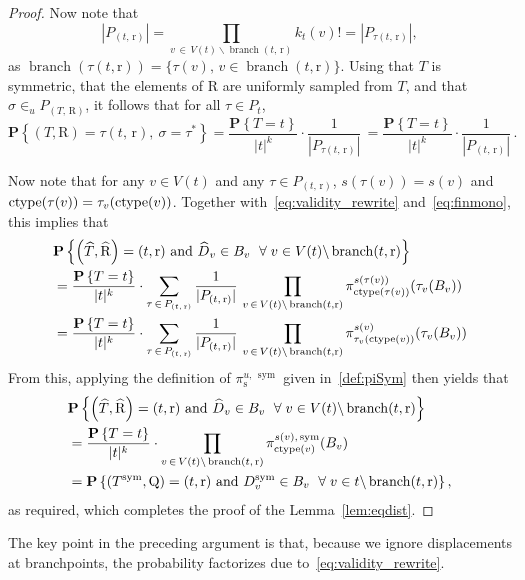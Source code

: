 \documentclass[10pt]{amsart}
\theoremstyle{definition}\newtheorem{defi}[theo]{Definition}\newtheorem{rema}[theo]{Remark}\newtheorem{exam}[theo]{Example}\newtheorem{exem}[theo]{Example}\newtheorem{nota}[theo]{Notation}
\newcommand{\rQ}{\mathrm{Q}}
\newcommand{\rR}{\mathrm{R}}
\newcommand{\rr}{\mathrm{r}}
\newcommand{\rs}{\mathrm{s}}
\DeclareMathOperator{\sym}{sym}
\DeclareMathOperator{\branch}{branch }
\DeclareMathOperator{\cht}{ctype}
\newcommand{\p}[1]{\mathbf{P}\left\{#1\right\}}
\newcommand{\Permvecs}{P}
\let\oldhat\hat
\renewcommand*{\hat}[1]{\mathchoice{\widehat{#1}}{\widehat{#1}}{\oldhat{#1}}{\oldhat{#1}}}
\let\oldforall\forall
\renewcommand*{\forall}{\mathrel{\oldforall}}
\begin{document}
\begin{proof}
Now note that
\[
|\Permvecs_{(t,\,\rr)}|= \prod_{v\,\in\,V(t)\backslash \branch(t,\,\rr)} k_t(v)!=|\Permvecs_{\tau(t,\,\rr)}|,
\]
as $\branch{(\tau(t,\rr))} = \{\tau(v),\, v\in \branch(t,\rr)\}$. Using that $T$ is symmetric, that the elements of $\rR$ are uniformly sampled from $T$, and that $\sigma \in_u \Permvecs_{(T,\,\rR)}$, it follows that for all $\tau \in \Permvecs_t$,
\begin{equation}\label{eq:finmono}
\p{(T,\rR)=\tau(t,\,\rr),\ \sigma=\tau^*} =
\frac{\p{T=t}}{|t|^k}\cdot \frac{1}{|\Permvecs_{\tau(t,\,\rr)}|}\, =
\frac{\p{T=t}}{|t|^k}\cdot \frac{1}{|\Permvecs_{(t,\,\rr)}|}\,.
\end{equation}

Now note that for any $v\in V(t)$ and any $\tau \in \Permvecs_{(t,\,\rr)}$, $s(\tau(v))=s(v)$ and $\cht(\tau(v))\linebreak= \tau_v(\cht(v))$. Together with~\eqref{eq:validity_rewrite} and~\eqref{eq:finmono}, this implies that
\begin{align*}
& \p{\left(\hat T,\hat \rR\right)=(t,\rr)\text{ and } \hat D_v \in B_v\ \forall v \in V(t)\backslash \branch(t,\rr)}\\
& =
\frac{\p{T=t}}{|t|^k} \cdot \sum_{\tau\,\in\,\Permvecs_{(t,\,\rr)}}
\frac{1}{|\Permvecs_{(t,\,\rr)}|}\,
\prod_{v\,\in\,V(t)\backslash \branch(t,\rr)} \pi^{s(\tau(v))}_{\cht(\tau(v))}(\tau_v(B_v))
\\
& =
\frac{\p{T=t}}{|t|^k} \cdot \sum_{\tau\,\in\,\Permvecs_{(t,\,\rr)}}
\frac{1}{|\Permvecs_{(t,\,\rr)}|}\,
\prod_{v\,\in\,V(t)\backslash \branch(t,\rr)} \pi^{s(v)}_{\tau_v(\cht(v))}(\tau_v(B_v))
\end{align*}
From this, applying the definition of $\pi^{u,\,\sym}_{\rs}$ given in~\eqref{def:piSym} then yields that
\begin{align*}
& \p{\left(\hat T,\hat \rR\right)=(t,\rr)\text{ and } \hat D_v \in B_v\ \forall v \in V(t)\backslash \branch(t,\rr)}\\
& =
\frac{\p{T=t}}{|t|^k}
\cdot \prod_{v\,\in\,V(t)\backslash \branch(t,\,\rr)} \pi_{\cht(v)}^{s(v),\,\sym}(B_v)\\
& =
\p{(T^{\sym},\rQ)=(t,\rr) \text{ and }D^{\sym}_v \in B_v\ \forall v \in t \backslash \branch(t,\rr)},
\end{align*}
as required, which completes the proof of the Lemma~\ref{lem:eqdist}.
\end{proof}

The key point in the preceding argument is that, because we ignore displacements at branchpoints, the probability factorizes due to~\eqref{eq:validity_rewrite}.
\end{document}
